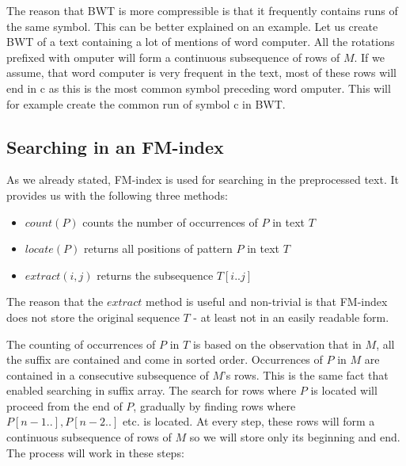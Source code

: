 The reason that BWT is more compressible is that it frequently contains runs of the same
symbol. This can be better explained on an example. Let us create BWT of a text containing
a lot of mentions of word computer. All the rotations prefixed with omputer will form a
continuous subsequence of rows of $M$. If we assume, that word computer is very frequent in the
text, most of these rows will end in c as this is the most common symbol preceding word omputer.
This will for example create the common run of symbol c in BWT.

\subsection{Searching in an FM-index}

As we already stated, FM-index is used for searching in the preprocessed text.
It provides us with the following three methods:

\begin{itemize}
	\item $count(P)$ counts the number of occurrences of $P$ in text $T$
	\item $locate(P)$ returns all positions of pattern $P$ in text $T$
	\item $extract(i, j)$ returns the subsequence $T[i..j]$
\end{itemize}

The reason that the $extract$ method is useful and non-trivial is that FM-index
does not store the original sequence $T$ - at least not in an easily readable form.

The counting of occurrences of $P$ in $T$ is based on the observation that in $M$,
all the suffix are contained and come in sorted order. Occurrences of $P$ in $M$
are contained in a consecutive subsequence of $M$'s rows. This is the same fact that
enabled searching in suffix array. The search for rows where $P$ is located will proceed
from the end of $P$, gradually by finding rows where $P[n-1..], P[n-2..]$ etc. is located.
At every step, these rows will form a continuous subsequence of rows of $M$ so we will store
only its beginning and end. The process will work in these steps:

